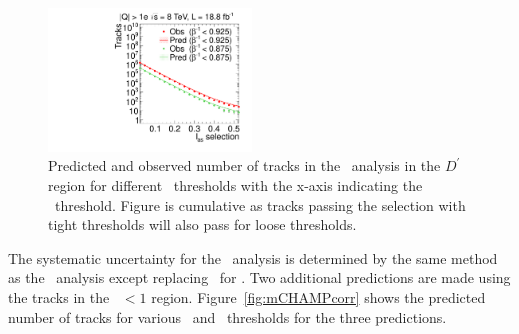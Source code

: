 \begin{figure}
 \begin{center}
  \includegraphics[clip=false, trim=0.0cm 0cm 0.0cm 0cm, width=0.48\textwidth]{figures/multi/Prediction_Data8TeV_NPredVsNObs_Flip}
 \end{center}
 \caption[Predicted and observed number of tracks in the \invbeta\ $<$ 1 region for different sets of thresholds in the \multi\ analysis.]
{Predicted and observed number of tracks in the \multi\ analysis in the $D^{\prime}$ region for different \invbeta\ thresholds with the x-axis indicating the \ias\ threshold.
Figure is cumulative as tracks passing the selection with tight thresholds will also pass for loose thresholds.
}
\label{fig:MultiPred}
\end{figure}

The systematic uncertainty for the \multi\ analysis is determined by the same method as the \muononly\ analysis except replacing \pt\ for \ias. 
Two additional predictions are made using the tracks in the \invbeta\ $< 1$ region.
Figure~\ref{fig:mCHAMPcorr} shows the predicted number of tracks for various \invbeta\ and \dedx\ thresholds for the three predictions.

